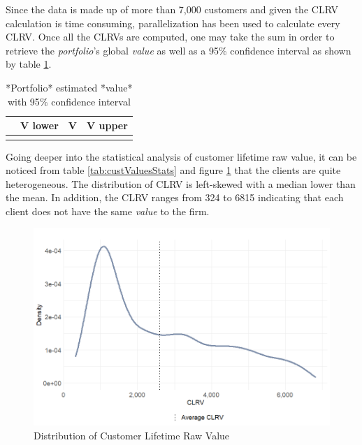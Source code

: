 \documentclass[
]{book}
\begin{document}
Since the data is made up of more than 7,000 customers and given the CLRV calculation is time consuming, parallelization has been used to calculate every CLRV. Once all the CLRVs are computed, one may take the sum in order to retrieve the \emph{portfolio}'s global \emph{value} as well as a 95\% confidence interval as shown by table \ref{tab:custValuesSum}.

\begin{table}[H]

\caption{\label{tab:custValuesSum}*Portfolio* estimated *value* with 95$\%$ confidence interval}
\centering
\begin{tabular}[t]{llll}
\toprule
  & V lower & V & V upper\\
\midrule
\cellcolor{gray!6}{} & \cellcolor{gray!6}{17,604,144} & \cellcolor{gray!6}{18,270,000} & \cellcolor{gray!6}{19,031,648}\\
\bottomrule
\end{tabular}
\end{table}

Going deeper into the statistical analysis of customer lifetime raw value, it can be noticed from table \ref{tab:custValuesStats} and figure \ref{fig:clrvDens} that the clients are quite heterogeneous. The distribution of CLRV is left-skewed with a median lower than the mean. In addition, the CLRV ranges from 324 to 6815 indicating that each client does not have the same \emph{value} to the firm.

\begin{figure}

{\centering \includegraphics[width=12.5in]{./imgs/clrv_density} 

}

\caption{Distribution of Customer Lifetime Raw Value}\label{fig:clrvDens}
\end{figure}
\end{document}
